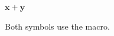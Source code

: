 \documentclass{article}
\newcommand{\vect}[1]{\mathbf{#1}}
\begin{document}
$\vect{x}+\vect{y}$

Both symbols use the macro.
\end{document}

